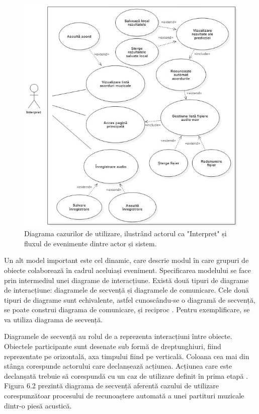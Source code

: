 \documentclass[a4paper,12pt]{report}
\begin{document}
\begin{figure}[h!]
    \centering
    \includegraphics[width=14cm]{..//resources//images//cazuri_de_utilizare_v3.JPG} 
    \caption{Diagrama cazurilor de utilizare, ilustrând actorul ca "Interpret"
și fluxul de evenimente dintre actor și sistem.}
\end{figure}
\newpage

Un alt model important este cel dinamic, care descrie modul în care grupuri 
de obiecte colaborează în cadrul aceluiași eveniment. Specificarea 
modelului se face prin intermediul unei diagrame de interacțiune. 
Există două tipuri de diagrame de interacțiune: diagramele de secvență 
și diagramele de comunicare. Cele două tipuri de diagrame 
sunt echivalente, astfel cunoscându-se o diagramă de secvență, se poate
construi diagrama de comunicare, și reciproc \cite{Ingineria-sistemelor-de-programare}. Pentru exemplificare, 
se va utiliza diagrama de secvență.

Diagramele de secvență au rolul de a reprezenta interacțiuni
între obiecte. Obiectele participante sunt desenate sub formă de dreptunghiuri,
fiind reprezentate pe orizontală, axa timpului fiind pe verticală.
Coloana cea mai din stânga corespunde actorului care declanșează acțiunea.
Acțiunea care este declanșată trebuie să corespundă cu un caz de utilizare 
definit în prima etapă \cite{Ingineria-sistemelor-de-programare}.
Figura 6.2 prezintă diagrama de secvență aferentă cazului de utilizare 
corespunzătoar procesului de recunoaștere automată a unei partituri muzicale 
dintr-o piesă acustică.
\end{document}
